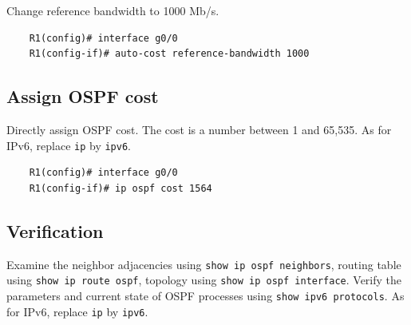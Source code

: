 Change reference bandwidth to 1000 Mb/s.
	\begin{verbatim}
	R1(config)# interface g0/0
	R1(config-if)# auto-cost reference-bandwidth 1000
	\end{verbatim}
	
\subsection{Assign OSPF cost}	

Directly assign OSPF cost. The cost is a number between 1 and 65,535. As for IPv6, replace \verb|ip| by \verb|ipv6|.
	\begin{verbatim}
	R1(config)# interface g0/0
	R1(config-if)# ip ospf cost 1564
	\end{verbatim}

\subsection{Verification}
Examine the neighbor adjacencies using \verb|show ip ospf neighbors|, routing table using \verb|show ip route ospf|, topology using \verb|show ip ospf interface|. Verify the parameters and current state of OSPF processes using \verb|show ipv6 protocols|.	As for IPv6, replace \verb|ip| by \verb|ipv6|.